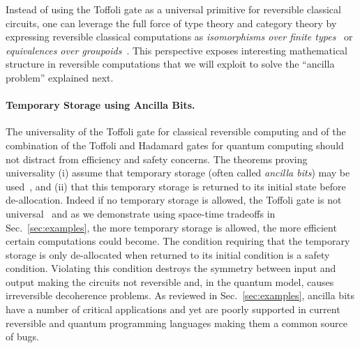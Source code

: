 \documentclass[sigplan,10pt,review,anonymous]{acmart}
\begin{document}
Instead of using the Toffoli gate as a universal primitive for
reversible classical circuits, one can leverage the full force of type
theory and category theory by expressing reversible classical
computations as \emph{isomorphisms over finite
  types}~\cite{Fiore:2004,James:2012:IE:2103656.2103667} or
\emph{equivalences over
  groupoids}~\cite{DBLP:conf/esop/CaretteS16}. This perspective
exposes interesting mathematical structure in reversible computations
that we will exploit to solve the ``ancilla problem'' explained next. 

\paragraph*{Temporary Storage using Ancilla Bits.} The universality of
the Toffoli gate for classical reversible computing and of the
combination of the Toffoli and Hadamard gates for quantum computing
should not distract from efficiency and safety concerns. The theorems
proving universality (i) assume that temporary storage (often called
\emph{ancilla bits}) may be used~\cite{Toffoli:1980}, and (ii) that
this temporary storage is returned to its initial state before
de-allocation. Indeed if no temporary storage is allowed, the Toffoli
gate is not universal~\cite{DBLP:conf/innovations/AaronsonGS17} and as
we demonstrate using space-time tradeoffs in Sec.~\ref{sec:examples},
the more temporary storage is allowed, the more efficient certain
computations could become. The condition requiring that the temporary
storage is only de-allocated when returned to its initial condition is
a safety condition. Violating this condition destroys the symmetry
between input and output making the circuits not reversible and, in
the quantum model, causes irreversible decoherence problems. As
reviewed in Sec.~\ref{sec:examples}, ancilla bits have a number of critical
applications and yet are poorly supported in current reversible and
quantum programming languages making them a common source of bugs.
\end{document}
